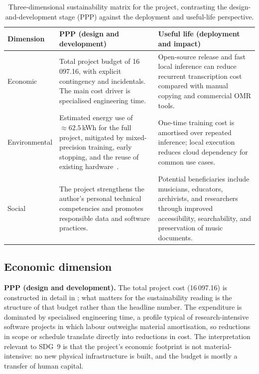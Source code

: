 \begin{table}[ht]
    \centering
    \caption{Three-dimensional sustainability matrix for the project, contrasting the design-and-development stage (PPP) against the deployment and useful-life perspective.}
    \label{tab:sustainability-matrix}
    \small
    \setlength{\tabcolsep}{5pt}
    \renewcommand{\arraystretch}{1.35}
    \begin{tabularx}{\linewidth}{@{} >{\raggedright\arraybackslash}p{2.3cm} L L @{}}
        \toprule
        \textbf{Dimension} & \textbf{PPP (design and development)} & \textbf{Useful life (deployment and impact)} \\
        \midrule
        Economic
            & Total project budget of \EUR{}16\,097.16, with explicit contingency and incidentals.
              The main cost driver is specialised engineering time.
            & Open-source release and fast local inference can reduce recurrent transcription cost compared with manual copying and commercial OMR tools. \\ \tfgrowsep
        Environmental
            & Estimated energy use of $\approx 62.5$\,kWh for the full project, mitigated by mixed-precision training, early stopping, and the reuse of existing
              hardware~\cite{reeInformeSistemaElectrico2024,mitecoFactorEmision2025}.
            & One-time training cost is amortised over repeated inference; local execution reduces cloud dependency for common use cases. \\ \tfgrowsep
        Social
            & The project strengthens the author's personal technical competencies and promotes responsible data and software practices.
            & Potential beneficiaries include musicians, educators, archivists, and researchers through improved accessibility, searchability, and preservation of music documents. \\
        \bottomrule
    \end{tabularx}
\end{table}

\subsection{Economic dimension}
\label{sec:sust-economic}

\textbf{PPP (design and development).}
The total project cost (\EUR{}16\,097.16) is constructed in detail
in ; what matters for the sustainability
reading is the structure of that budget rather than the headline
number.
The expenditure is dominated by specialised engineering time, a
profile typical of research-intensive software projects in which
labour outweighs material amortisation, so reductions in scope or
schedule translate directly into reductions in cost.
The interpretation relevant to SDG~9 is that the project's economic
footprint is not material-intensive: no new physical infrastructure
is built, and the budget is mostly a transfer of human capital.


